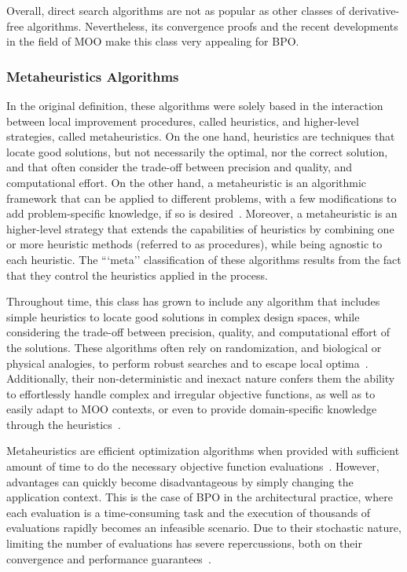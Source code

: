 	Overall, direct search algorithms are not as popular as other classes of derivative-free algorithms. Nevertheless, its convergence proofs and the recent developments in the field of \ac{MOO} make this class very appealing for \ac{BPO}. 
	
	\subsubsection{Metaheuristics Algorithms}
	\label{ssec:metaheuristics}
	
	In the original definition, these algorithms were solely based in the interaction between local improvement procedures, called heuristics, and higher-level strategies, called metaheuristics. On the one hand, heuristics are techniques that locate good solutions, but not necessarily the optimal, nor the correct solution, and that often consider the trade-off between precision and quality, and computational effort. On the other hand, a metaheuristic is an algorithmic framework that can be applied to different problems, with a few modifications to add problem-specific knowledge, if so is desired~\cite{Glover2003Metaheuristics}. Moreover, a metaheuristic is an higher-level strategy that extends the capabilities of heuristics by combining one or more heuristic methods (referred to as procedures), while being agnostic to each heuristic. The ```meta'' classification of these algorithms results from the fact that they control the heuristics applied in the process.
	
	Throughout time, this class has grown to include any algorithm that includes simple heuristics to locate good solutions in complex design spaces, while considering the trade-off between precision, quality, and computational effort of the solutions. These algorithms often rely on randomization, and biological or physical analogies, to perform robust searches and to escape local optima~\cite{Glover2003Metaheuristics}. Additionally, their non-deterministic and inexact nature confers them the ability to effortlessly handle complex and irregular objective functions, as well as to easily adapt to \ac{MOO} contexts, or even to provide domain-specific knowledge through the heuristics~\cite{Wortmann2017GABESTCHOICE}.
	
	Metaheuristics are efficient optimization algorithms when provided with sufficient amount of time to do the necessary objective function evaluations~\cite{Conn2009}. However, advantages can quickly become disadvantageous by simply changing the application context. This is the case of \ac{BPO} in the architectural practice, where each evaluation is a time-consuming task and the execution of thousands of evaluations rapidly becomes an infeasible scenario. Due to their stochastic nature, limiting the number of evaluations has severe repercussions, both on their convergence and performance guarantees~\cite{Hasancebi2009}. 
	
